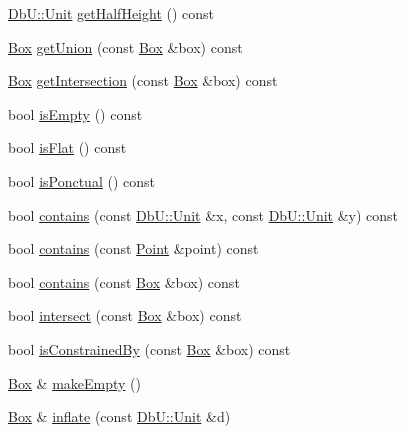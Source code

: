 \begin{DoxyCompactItemize}
\item 
\mbox{\hyperlink{group__DbUGroup_ga4fbfa3e8c89347af76c9628ea06c4146}{Db\+U\+::\+Unit}} \mbox{\hyperlink{classHurricane_1_1Box_a5c94554a78398c4a5c7dedd024926abb}{get\+Half\+Height}} () const
\item 
\mbox{\hyperlink{classHurricane_1_1Box}{Box}} \mbox{\hyperlink{classHurricane_1_1Box_a2670058f109dfae32d284db249e533bc}{get\+Union}} (const \mbox{\hyperlink{classHurricane_1_1Box}{Box}} \&box) const
\item 
\mbox{\hyperlink{classHurricane_1_1Box}{Box}} \mbox{\hyperlink{classHurricane_1_1Box_a610f9c63bc5636ef304f4768215ffb12}{get\+Intersection}} (const \mbox{\hyperlink{classHurricane_1_1Box}{Box}} \&box) const
\item 
bool \mbox{\hyperlink{classHurricane_1_1Box_af8b269603b5c173891a484214ca50266}{is\+Empty}} () const
\item 
bool \mbox{\hyperlink{classHurricane_1_1Box_a0df4d580a3dc1eb23d839c0f53cdee8b}{is\+Flat}} () const
\item 
bool \mbox{\hyperlink{classHurricane_1_1Box_a3d073c5bc3d0ea1b4f21937e36be001f}{is\+Ponctual}} () const
\item 
bool \mbox{\hyperlink{classHurricane_1_1Box_ae18dd30ffbf0b75714ece480f21e2898}{contains}} (const \mbox{\hyperlink{group__DbUGroup_ga4fbfa3e8c89347af76c9628ea06c4146}{Db\+U\+::\+Unit}} \&x, const \mbox{\hyperlink{group__DbUGroup_ga4fbfa3e8c89347af76c9628ea06c4146}{Db\+U\+::\+Unit}} \&y) const
\item 
bool \mbox{\hyperlink{classHurricane_1_1Box_a19ad23904fbfe2afb3683affeb2cac7e}{contains}} (const \mbox{\hyperlink{classHurricane_1_1Point}{Point}} \&point) const
\item 
bool \mbox{\hyperlink{classHurricane_1_1Box_ac567c569f23643e58867afee80f6920a}{contains}} (const \mbox{\hyperlink{classHurricane_1_1Box}{Box}} \&box) const
\item 
bool \mbox{\hyperlink{classHurricane_1_1Box_ae76b57bf6399b29021813da8d3f306ec}{intersect}} (const \mbox{\hyperlink{classHurricane_1_1Box}{Box}} \&box) const
\item 
bool \mbox{\hyperlink{classHurricane_1_1Box_a70d832443d97cb40ec7cb4f0f959a977}{is\+Constrained\+By}} (const \mbox{\hyperlink{classHurricane_1_1Box}{Box}} \&box) const
\item 
\mbox{\hyperlink{classHurricane_1_1Box}{Box}} \& \mbox{\hyperlink{classHurricane_1_1Box_a0717b1b105f65f8284c9b4e36df3a766}{make\+Empty}} ()
\item 
\mbox{\hyperlink{classHurricane_1_1Box}{Box}} \& \mbox{\hyperlink{classHurricane_1_1Box_a90207e7ca8044a6afc72674cc6ae366e}{inflate}} (const \mbox{\hyperlink{group__DbUGroup_ga4fbfa3e8c89347af76c9628ea06c4146}{Db\+U\+::\+Unit}} \&d)

\end{DoxyCompactItemize}
